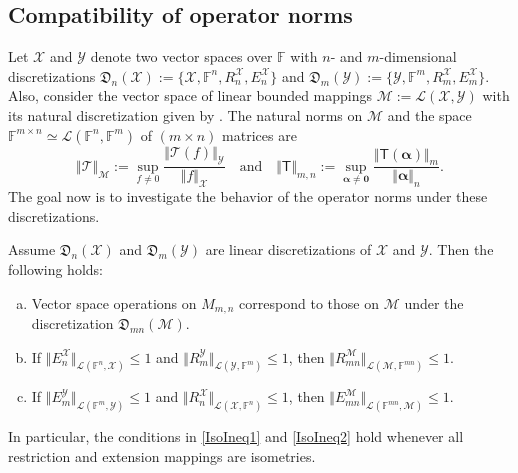\documentclass[a4paper]{paper}
\newcommand{\Discr}{\mathfrak{D}}
\newcommand{\VecSpace}[1]{\mathscr{#1}}
\newcommand{\Field}{\mathbb{F}}
\newcommand{\Op}[1]{\mathcal{#1}}
\newcommand{\DiscOp}[1]{\mathsf{#1}}
\newcommand*{\EXT}[2]{\ensuremath{E_{#1}^{#2}}}
\newcommand*{\REST}[2]{\ensuremath{R_{#1}^{#2}}}
\newcommand*{\RnX}{\ensuremath{\REST{n}{\VecSpace{X}}}}
\newcommand*{\RmX}{\ensuremath{\REST{m}{\VecSpace{X}}}}
\newcommand*{\RmY}{\ensuremath{\REST{m}{\VecSpace{Y}}}}
\newcommand*{\EnX}{\ensuremath{\EXT{n}{\VecSpace{X}}}}
\newcommand*{\EmX}{\ensuremath{\EXT{m}{\VecSpace{X}}}}
\newcommand*{\EmY}{\ensuremath{\EXT{m}{\VecSpace{Y}}}}
\newcommand{\vzero}{\boldsymbol{0}}
\newcommand{\valpha}{\boldsymbol{\alpha}}
\begin{document}
\subsection{Compatibility of operator norms}
Let $\VecSpace{X}$ and $\VecSpace{Y}$ denote two vector spaces over $\Field$ with 
$n$- and $m$-dimensional discretizations 
$\Discr_{n}(\VecSpace{X}) := \{ \VecSpace{X}, \Field^{n}, \RnX,\EnX \}$
and 
$\Discr_{m}(\VecSpace{Y}) := \{ \VecSpace{Y}, \Field^{m}, \RmX, \EmX \}$.
Also, consider the vector space of linear bounded mappings $\VecSpace{M}:=\VecSpace{L}(\VecSpace{X},\VecSpace{Y})$ 
with its natural discretization given by .
The natural norms on $\VecSpace{M}$ and the space $\Field^{m \times n} \simeq \VecSpace{L}(\Field^n,\Field^m)$ 
of $(m \times n)$ matrices 
are 
\[  \Vert \Op{T} \Vert_{\VecSpace{M}} := \sup_{f \neq 0} \frac{\bigl\Vert \Op{T}(f) \bigr\Vert_{\VecSpace{Y}}}{\Vert f 
\Vert_{\VecSpace{X}}} 
   \quad\text{and}\quad
   \Vert \DiscOp{T} \Vert_{m,n} := \sup_{\valpha \neq \vzero} 
     \frac{\bigl\Vert \DiscOp{T}(\valpha) \bigr\Vert_{m}}{\Vert \valpha \Vert_{n}}. 
\]
The goal now is to investigate the behavior of the operator norms under these discretizations.
\begin{theorem}
Assume $\Discr_{n}(\VecSpace{X})$ and $ \Discr_{m}(\VecSpace{Y})$ are linear discretizations of 
$\VecSpace{X}$ and $\VecSpace{Y}$. Then the following holds:
\begin{enumerate}[(a)]
\item Vector space operations on $M_{m,n}$ correspond to those on 
$\VecSpace{M}$ under the discretization $\Discr_{m n}(\VecSpace{M})$.
\item If 
  $\Vert \EnX \Vert_{\VecSpace{L}(\Field^n, \VecSpace{X})} \leq 1$
  and 
 $\Vert \RmY \Vert_{\VecSpace{L}(\VecSpace{Y},\Field^m)} \leq 1$,
 then $\Vert R_{m n}^{\VecSpace{M}} \Vert_{\VecSpace{L}(\VecSpace{M},\Field^{mn})} \leq 1$.%
 \label{IsoIneq1}%
\item If 
  $\Vert \EmY \Vert_{\VecSpace{L}(\Field^m, \VecSpace{Y})} \leq 1$ 
  and
  $\Vert \RnX \Vert_{\VecSpace{L}(\VecSpace{X},\Field^n)} \leq 1$, 
  then $\Vert E_{m n}^{\VecSpace{M}} \Vert_{\VecSpace{L}(\Field^{mn}, \VecSpace{M})} \leq 1$.%
  \label{IsoIneq2}%
\end{enumerate}
In particular, the conditions in \eqref{IsoIneq1} and \eqref{IsoIneq2} hold whenever all restriction and extension mappings 
are isometries.
\end{theorem}
\end{document}
